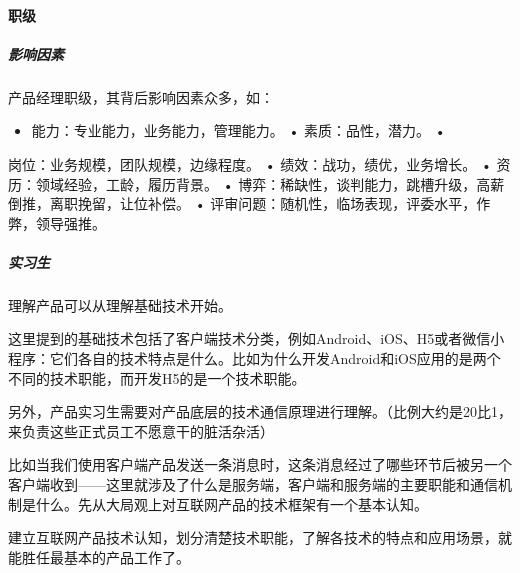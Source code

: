 \documentclass[letterpaper,10pt,english]{sphinxmanual}
\begin{document}
\paragraph{职级}
\label{\detokenize{chapter_introduction/career_path:id7}}

\subparagraph{影响因素}
\label{\detokenize{chapter_introduction/career_path:id8}}
产品经理职级，其背后影响因素众多，如：%
\begin{footnote}[353]\sphinxAtStartFootnote
{}
%
\end{footnote}
\begin{itemize}
\item {} 
能力：专业能力，业务能力，管理能力。 • 素质：品性，潜力。 •

\end{itemize}

岗位：业务规模，团队规模，边缘程度。 • 绩效：战功，绩优，业务增长。 •
资历：领域经验，工龄，履历背景。 •
博弈：稀缺性，谈判能力，跳槽升级，高薪倒推，离职挽留，让位补偿。 •
评审问题：随机性，临场表现，评委水平，作弊，领导强推。


\subparagraph{实习生}
\label{\detokenize{chapter_introduction/career_path:id9}}\label{\detokenize{chapter_introduction/career_path:id10}}
理解产品可以从理解基础技术开始。

这里提到的基础技术包括了客户端技术分类，例如Android、iOS、H5或者微信小程序：它们各自的技术特点是什么。比如为什么开发Android和iOS应用的是两个不同的技术职能，而开发H5的是一个技术职能。

另外，产品实习生需要对产品底层的技术通信原理进行理解。（比例大约是20比1，来负责这些正式员工不愿意干的脏活杂活）

比如当我们使用客户端产品发送一条消息时，这条消息经过了哪些环节后被另一个客户端收到——这里就涉及了什么是服务端，客户端和服务端的主要职能和通信机制是什么。先从大局观上对互联网产品的技术框架有一个基本认知。

建立互联网产品技术认知，划分清楚技术职能，了解各技术的特点和应用场景，就能胜任最基本的产品工作了。
\end{document}
